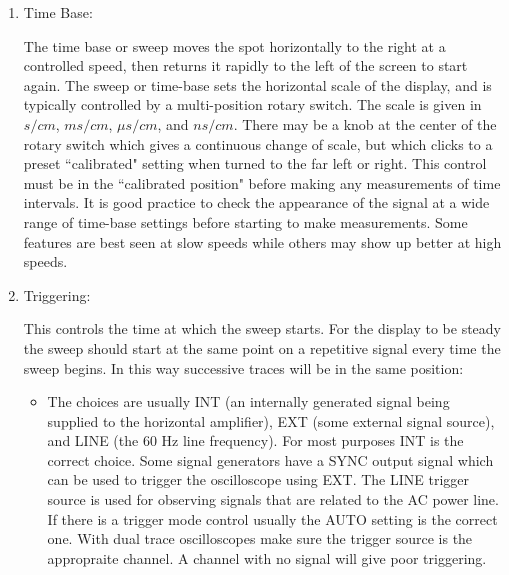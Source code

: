 \begin{enumerate}
    \item Time Base:

        The time base or sweep moves the spot horizontally to the right at a controlled speed, then returns it rapidly to the left of the screen to start again. The sweep or time-base sets the horizontal scale of the display, and is typically controlled by a multi-position rotary switch. The scale is given in $s/cm$, $ms/cm$, $\mu s/cm$, and $ns/cm$. There may be a knob at the center of the rotary switch which gives a continuous change of scale, but which clicks to a preset ``calibrated" setting when turned to the far left or right. This control must be in the ``calibrated position" before making any measurements of time intervals. It is good practice to check the appearance of the signal at a wide range of time-base settings before starting to make measurements. Some features are best seen at slow speeds while others may show up better at high speeds.

    \item Triggering:

        This controls the time at which the sweep starts. For the display to be steady the sweep should start at the same point on a repetitive signal every time the sweep begins. In this way successive traces will be in the same position:
        \begin{itemize}
            \item {} The choices are usually INT (an internally generated signal being supplied to the horizontal amplifier), EXT (some external signal source), and LINE (the $60$ Hz line frequency). For most purposes INT is the correct choice. Some signal generators have a SYNC output signal which can be used to trigger the oscilloscope using EXT. The LINE trigger source is used for observing signals that are related to the AC power line. If there is a trigger mode control usually the AUTO setting is the correct one. With dual trace oscilloscopes make sure the trigger source is the appropraite channel. A channel with no signal will give poor triggering.


\end{itemize}
\end{enumerate}
